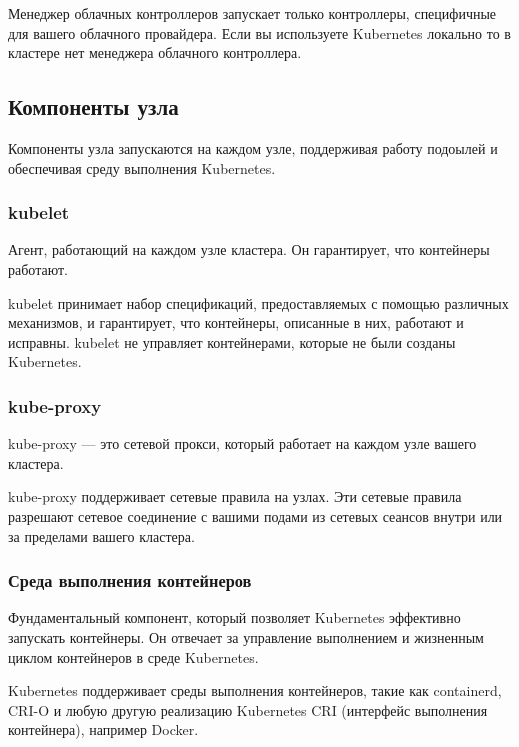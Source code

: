 \documentclass[a4page]{article}
\begin{document}
Менеджер облачных контроллеров запускает только контроллеры, специфичные для вашего облачного провайдера. Если вы используете Kubernetes локально то в кластере нет менеджера облачного контроллера.

\subsection{Компоненты узла}
Компоненты узла запускаются на каждом узле, поддерживая работу подоылей и обеспечивая среду выполнения Kubernetes\cite{k8s:n-components}.

\subsubsection{kubelet}
Агент, работающий на каждом узле кластера. Он гарантирует, что контейнеры работают.

kubelet принимает набор спецификаций, предоставляемых с помощью различных механизмов, и гарантирует, что контейнеры, описанные в них, работают и исправны. kubelet не управляет контейнерами, которые не были созданы Kubernetes.

\subsubsection{kube-proxy}
kube-proxy --- это сетевой прокси, который работает на каждом узле вашего кластера.

kube-proxy поддерживает сетевые правила на узлах. Эти сетевые правила разрешают сетевое соединение с вашими подами из сетевых сеансов внутри или за пределами вашего кластера.

\subsubsection{Среда выполнения контейнеров}
Фундаментальный компонент, который позволяет Kubernetes эффективно \\запускать контейнеры. Он отвечает за управление выполнением и жизненным циклом контейнеров в среде Kubernetes.

Kubernetes поддерживает среды выполнения контейнеров, такие как containerd, CRI-O и любую другую реализацию Kubernetes CRI (интерфейс выполнения контейнера), например Docker.
\end{document}

